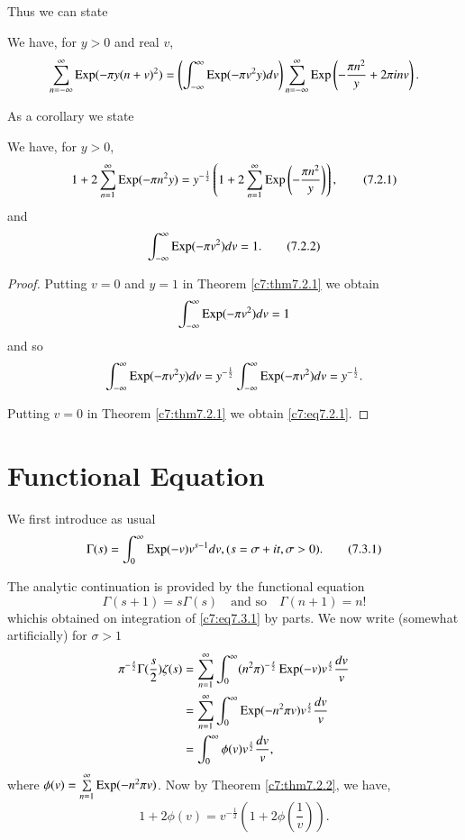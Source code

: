 Thus we can state

\begin{theorem}\label{c7:thm7.2.1}
We have, for $y>0$ and real $v$,
{\fontsize{10}{12}\selectfont
$$
\sum^{\infty}_{n=-\infty}\operatorname{Exp}(-\pi
y(n+v)^{2})=\left(\int^{\infty}_{-\infty}\operatorname{Exp}(-\pi
v^{2}y)dv\right)\sum^{\infty}_{n=-\infty}\operatorname{Exp}\left(-\frac{\pi
  n^{2}}{y}+2\pi inv\right).
$$}
\end{theorem}

As a corollary we state
\begin{theorem}\label{c7:thm7.2.2}
We have, for $y>0$,
\begin{equation*}
1+2\sum^{\infty}_{n=1}\operatorname{Exp}(-\pi
n^{2}y)=y^{-\frac{1}{2}}\left(1+2\sum^{\infty}_{n=1}\operatorname{Exp}\left(-\frac{\pi n^{2}}{y}\right)\right),\tag{7.2.1}\label{c7:eq7.2.1}
\end{equation*}
and
\begin{equation*}
\int^{\infty}_{-\infty}\operatorname{Exp}(-\pi v^{2})dv=1.\tag{7.2.2}\label{c7:eq7.2.2}
\end{equation*}
\end{theorem}

\begin{proof}
Putting $v=0$ and $y=1$ in Theorem \ref{c7:thm7.2.1} we obtain
$$
\int^{\infty}_{-\infty}\operatorname{Exp} (-\pi v^{2})dv=1
$$
and so
$$
\int^{\infty}_{-\infty}\operatorname{Exp}(-\pi
v^{2}y)dv=y^{-\frac{1}{2}}\int^{\infty}_{-\infty}\operatorname{Exp}(-\pi
v^{2})dv=y^{-\frac{1}{2}}. 
$$

Putting $v=0$ in Theorem \ref{c7:thm7.2.1} we obtain
\eqref{c7:eq7.2.1}. 
\end{proof}

\section{Functional Equation}\label{c7:sec7.3}

We first introduce as usual
\begin{equation*}
\Gamma(s)=\int^{\infty}_{0}\operatorname{Exp}(-v)v^{s-1}dv,
(s=\sigma+it,\sigma>0).\tag{7.3.1}\label{c7:eq7.3.1}
\end{equation*}

The analytic continuation is provided by the functional equation
\begin{equation*}
\Gamma(s+1)=s\Gamma(s)\quad\text{and so}\quad
\Gamma(n+1)=n!\tag{7.3.2}\label{c7:eq7.3.2} 
\end{equation*}
which\pageoriginale is obtained on integration of
\eqref{c7:eq7.3.1} by parts. We now write (somewhat artificially)
for $\sigma>1$
\begin{align*}
\pi^{-\frac{s}{2}}\Gamma(\frac{s}{2})\zeta(s) &=
\sum^{\infty}_{n=1}\int^{\infty}_{0}(n^{2}\pi)^{-\frac{s}{2}}\operatorname{Exp}(-v)v^{\frac{s}{2}}\frac{dv}{v}\\
&= \sum^{\infty}_{n=1}\int^{\infty}_{0}\operatorname{Exp}(-n^{2}\pi
v)v^{\frac{s}{2}}\frac{dv}{v}\\ 
&= \int^{\infty}_{0}\phi(v)v^{\frac{s}{2}}\frac{dv}{v},
\end{align*}
where $\phi(v)=\sum\limits^{\infty}_{n=1}\operatorname{Exp}(-n^{2}\pi v)$. Now by
Theorem \ref{c7:thm7.2.2}, we have,
$$
1+2\phi (v)=v^{-\frac{1}{2}} \left(1+2\phi \left(\frac{1}{v} \right) \right).
$$

